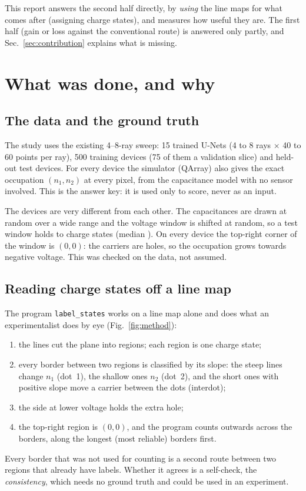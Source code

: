 \documentclass[10pt,a4paper]{article}
\begin{document}
This report answers the second half directly, by \emph{using} the line maps
for what comes after (assigning charge states), and measures how useful
they are.  The first half (gain or loss against the conventional route) is
answered only partly, and Sec.~\ref{sec:contribution} explains what is
missing.

\section{What was done, and why}

\subsection{The data and the ground truth}
The study uses the existing 4--8-ray sweep: 15 trained U-Nets (4 to 8 rays
$\times$ 40 to 60 points per ray), 500 training devices (75 of them a
validation slice) and \vNTest{} held-out test devices.  For every device the
simulator (QArray) also gives the exact occupation $(n_1,n_2)$ at every
pixel, from the capacitance model with no sensor involved.  This is the
answer key: it is used only to score, never as an input.

The devices are very different from each other.  The capacitances are drawn
at random over a wide range and the voltage window is shifted at random, so
a test window holds \vNStMin{} to \vNStMax{} charge states (median
\vNStMed).  On every device the top-right corner of the window is $(0,0)$:
the carriers are holes, so the occupation grows towards negative voltage.
This was checked on the data, not assumed.

\subsection{Reading charge states off a line map}
The program \texttt{label\_states} works on a line map alone and does what an
experimentalist does by eye (Fig.~\ref{fig:method}):
\begin{enumerate}
\item the lines cut the plane into regions; each region is one charge state;
\item every border between two regions is classified by its slope: the
  steep lines change $n_1$ (dot~1), the shallow ones $n_2$ (dot~2), and the
  short ones with positive slope move a carrier between the dots
  (interdot);
\item the side at lower voltage holds the extra hole;
\item the top-right region is $(0,0)$, and the program counts outwards
  across the borders, along the longest (most reliable) borders first.
\end{enumerate}
Every border that was not used for counting is a second route between two
regions that already have labels.  Whether it agrees is a self-check, the
\emph{consistency}, which needs no ground truth and could be used in an
experiment.
\end{document}
